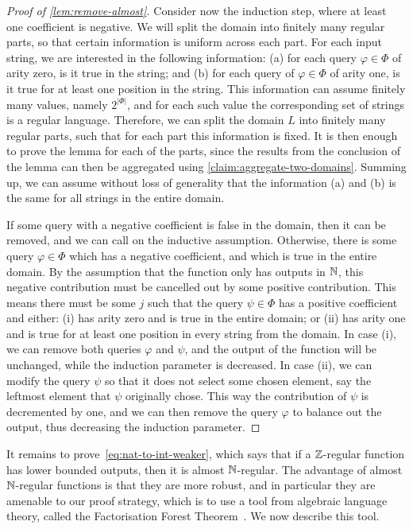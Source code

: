 \begin{proof}[Proof of \cref{lem:remove-almost}]
        Consider now the induction step, where at least one coefficient is negative. We will split the domain into finitely many regular parts, so that certain information is uniform across each part. 
        For each input string, we are interested in the following information: (a) for each query $\varphi \in \Phi$ of arity zero, is it true in the string; and (b) for each query of $\varphi \in \Phi$ of arity one, is it true for at least one position in the string. This information can assume finitely many values, namely $2^{|\Phi|}$, and for each such value the corresponding set of strings is a regular language. Therefore, we can split the domain $L$ into finitely many regular parts, such that for each part this information is fixed. It is then enough to prove the lemma for each of the parts, since the results from the conclusion of the lemma can then be aggregated using  \cref{claim:aggregate-two-domains}. Summing up, we  can assume without loss of generality that the information (a) and (b) is the same for all strings in the entire domain. 
        
        If some query with a negative coefficient is false in the domain, then it can be removed, and we can call on the inductive assumption. Otherwise, there is some query $\varphi \in \Phi$ which has a negative coefficient, and which is true in the entire domain. By the assumption that the function only has outputs in ${\mathbb N}$, this negative contribution must be cancelled out by some positive contribution. This means  there must be some $j$ such that the query $\psi \in \Phi$ has a positive coefficient and either: (i) has arity zero and is true in the entire domain; or (ii) has arity one and is true for at least one position in every string from the domain. In case (i), we can remove both queries $\varphi$ and $\psi$, and the output of the function will be unchanged, while the induction parameter is decreased. In case (ii), we can modify the query $\psi$ so that it does not select some chosen element, say the leftmost element that $\psi$ originally chose. This way the contribution of $\psi$ is decremented by one, and we can then remove the query $\varphi$ to balance out the output, thus decreasing the induction parameter.
    \end{proof}

It remains to prove~\eqref{eq:nat-to-int-weaker}, which says that if a ${\mathbb Z}$-regular function has lower bounded outputs, then it is almost ${\mathbb N}$-regular. The advantage of almost ${\mathbb N}$-regular functions is that they are more robust, and in particular they are amenable to our proof strategy, which is to use a tool from algebraic language theory, called the Factorisation Forest Theorem~\cite[Theorem 6.1]{simonFactorizationForestsFinite1990}. We now describe this tool.

